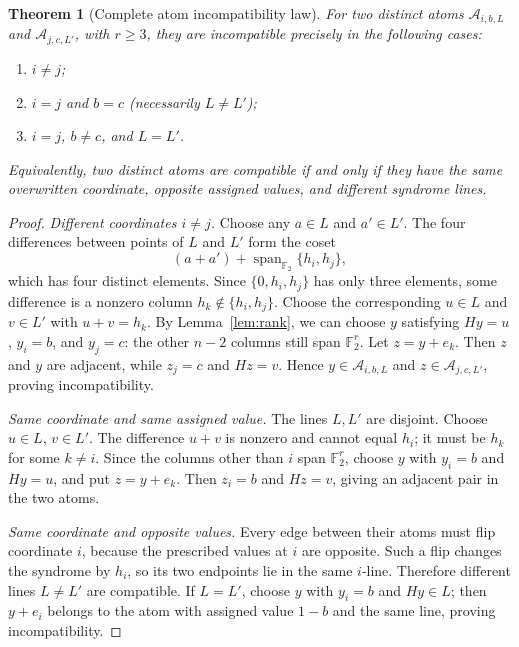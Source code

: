 \documentclass[11pt,a4paper]{article}
\newtheorem{theorem}{Theorem}[section]
\begin{document}
\begin{theorem}[Complete atom incompatibility law]\label{thm:adj}
For two \emph{distinct} atoms $\mathcal A_{i,b,L}$ and $\mathcal A_{j,c,L'}$, with $r\ge3$, they are incompatible precisely in the following cases:
\begin{enumerate}[label=(\roman*),leftmargin=2em]
\item $i\ne j$;
\item $i=j$ and $b=c$ (necessarily $L\ne L'$);
\item $i=j$, $b\ne c$, and $L=L'$.
\end{enumerate}
Equivalently, two distinct atoms are compatible if and only if they have the same overwritten coordinate, opposite assigned values, and different syndrome lines.
\end{theorem}
\begin{proof}
\emph{Different coordinates $i\ne j$.} Choose any $a\in L$ and $a'\in L'$. The four differences between points of $L$ and $L'$ form the coset
\[
       (a+a')+\operatorname{span}_{\mathbb F_2}\{h_i,h_j\},
\]
which has four distinct elements. Since $\{0,h_i,h_j\}$ has only three elements, some difference is a nonzero column $h_k\notin\{h_i,h_j\}$. Choose the corresponding $u\in L$ and $v\in L'$ with $u+v=h_k$. By Lemma~\ref{lem:rank}, we can choose $y$ satisfying $Hy=u$, $y_i=b$, and $y_j=c$: the other $n-2$ columns still span $\mathbb F_2^r$. Let $z=y+e_k$. Then $z$ and $y$ are adjacent, while $z_j=c$ and $Hz=v$. Hence $y\in\mathcal A_{i,b,L}$ and $z\in\mathcal A_{j,c,L'}$, proving incompatibility.

\emph{Same coordinate and same assigned value.} The lines $L,L'$ are disjoint. Choose $u\in L$, $v\in L'$. The difference $u+v$ is nonzero and cannot equal $h_i$; it must be $h_k$ for some $k\ne i$. Since the columns other than $i$ span $\mathbb F_2^r$, choose $y$ with $y_i=b$ and $Hy=u$, and put $z=y+e_k$. Then $z_i=b$ and $Hz=v$, giving an adjacent pair in the two atoms.

\emph{Same coordinate and opposite values.} Every edge between their atoms must flip coordinate $i$, because the prescribed values at $i$ are opposite. Such a flip changes the syndrome by $h_i$, so its two endpoints lie in the same $i$-line. Therefore different lines $L\ne L'$ are compatible. If $L=L'$, choose $y$ with $y_i=b$ and $Hy\in L$; then $y+e_i$ belongs to the atom with assigned value $1-b$ and the same line, proving incompatibility.
\end{proof}
\end{document}
